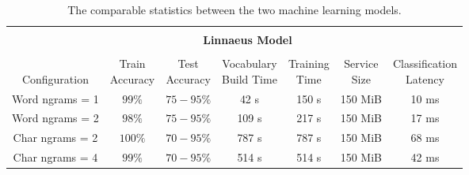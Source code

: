 \begin{table}[H]
\centering
\renewcommand\arraystretch{1.2}
\tiny

\caption{The comparable statistics between the two machine learning models.}
\label{tab:stats}

\begin{tabularx}{\textwidth}{@{} ccccccc}
    \toprule
    &&& &&&\\
    &&\multicolumn{3}{c}{\centering\parbox{5cm}{\centering\large\textbf{Linnaeus Model}}} \\
    &&& &&&\\
    \multirow{2}{*}{\centering\parbox{1.5cm}{\centering \\Configuration}} & \multirow{2}{*}{\centering\parbox{1cm}{\centering Train\\Accuracy}}  & \multirow{2}{*}{\centering\parbox{1cm}{\centering Test\\Accuracy}} & \multirow{2}{*}{\centering\parbox{1.5cm}{\centering Vocabulary\\Build Time}} & \multirow{2}{*}{\centering\parbox{1cm}{\centering Training\\Time}} & \multirow{2}{*}{\centering\parbox{1cm}{\centering Service\\Size}} & \multirow{2}{*}{\centering\parbox{1.5cm}{\centering Classification\\Latency}}\\
    &&&&&&\\
    \midrule
            Word ngrams = 1 & $99\%$ & $75-95\%$ & 42 s &150 s& 150 MiB & 10 ms\\
            Word ngrams = 2 & $98\%$ & $75-95\%$ & 109 s &217 s & 150 MiB & 17 ms\\
            Char ngrams = 2 & $100\%$ & $70-95\%$ & 787 s &787 s & 150 MiB & 68 ms\\
            Char ngrams = 4 & $99\%$ & $70-95\%$ & 514 s &514 s& 150 MiB & 42 ms\\
    \bottomrule
\end{tabularx}



\end{table}
